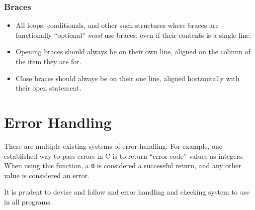 \documentclass[11pt]{book}
\begin{document}
\subsection{Braces}\label{braces}

\begin{itemize}
\item
  All loops, conditionals, and other such structures where braces are
  functionally ``optional'' \emph{must} use braces, even if their
  contents is a single line.
\item
  Opening braces should always be on their own line, aligned on the
  column of the item they are for.
\item
  Close braces should always be on their one line, aligned horizontally
  with their open statement.
\end{itemize}

\chapter{Error Handling}\label{error-handling}

There are multiple existing systems of error handling. For example, one
established way to pass errors in C is to return ``error code'' values
as integers. When using this function, a \texttt{0} is considered a successful
return, and any other value is considered an error.

It is prudent to devise and follow and error handling and checking
system to use in all programs.
\end{document}
